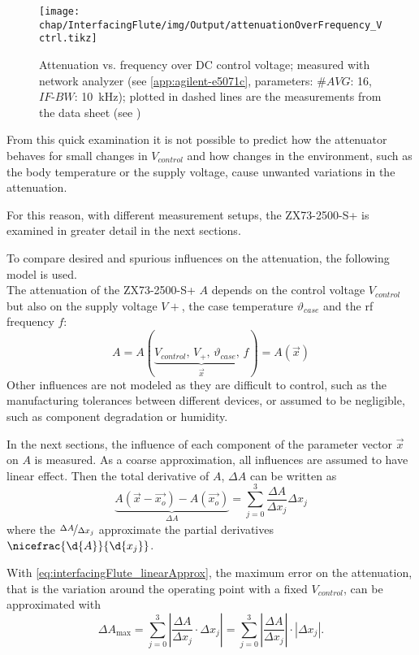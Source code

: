 \begin{figure}[tb]
	\centering
	\texttt{[image: chap/InterfacingFlute/img/Output/attenuationOverFrequency\_Vctrl.tikz]}
	\caption{Attenuation vs. frequency over DC control voltage; measured with network analyzer (see \ref{app:agilent-e5071c}, parameters: $\#AVG$: 16, $IF\text{-}BW$: \SI{10}{\kHz}); plotted in dashed lines are the measurements from the data sheet (see \cite[p.~2]{mini-circuitsZX732500VoltageVariable})}
	\label{fig:interfacingFlute_atteneval-overview-NA}
\end{figure}

From this quick examination it is not possible to predict how the attenuator behaves for small changes in $V_{control}$ and how changes in the environment, such as the body temperature or the supply voltage, cause unwanted variations in the attenuation. 

For this reason, with different measurement setups, the ZX73-2500-S+ is examined in greater detail in the next sections.

To compare desired and spurious influences on the attenuation, the following model is used.\\
The attenuation of the ZX73-2500-S+ $A$ depends on the control voltage $V_{control}$ but also on the supply voltage $V+$, the case temperature $\vartheta_{case}$ and the \gls{rf} frequency $f$:
\begin{equation}
A=A(\underbrace{V_{control},\,V_+,\,\vartheta_{case},\,f}_{\vec{x}}) = A\left(\vec{x}\right)
\end{equation}
Other influences are not modeled as they are difficult to control, such as the manufacturing tolerances between different devices, or assumed to be negligible, such as component degradation or humidity.

In the next sections, the influence of each component of the parameter vector $\vec{x}$ on $A$ is measured. As a coarse approximation, all influences are assumed to have linear effect. Then the total derivative of $A$, $\Delta A$ can be written as
\begin{equation}\label{eq:interfacingFlute_linearApprox}
\underbrace{A(\vec{x}-\vec{x_o})-A(\vec{x_o})}_{\Delta A} = \sum_{j=0}^{3} \frac{\Delta A}{\Delta x_j} \Delta x_j
\end{equation}
where the $\nicefrac{\Delta A}{\Delta x_j}$ approximate the partial derivatives $\nicefrac{\d{A}}{\d{x_j}}$.

With \autoref{eq:interfacingFlute_linearApprox}, the maximum error on the attenuation, that is the variation around the operating point with a fixed $V_{control}$, can be approximated with
\begin{equation}\label{eq:interfacingFlute_maxerror}
\Delta A_{\text{max}} = \sum_{j=0}^{3} \left|\frac{\Delta A}{\Delta x_j} \cdot \Delta x_j\right| 
= \sum_{j=0}^{3} \left|\frac{\Delta A}{\Delta x_j}\right| \cdot \left|\Delta x_j\right|.
\end{equation}

